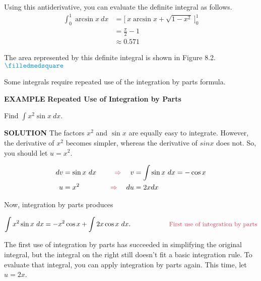 \documentclass[oneside]{book}
\begin{document}
\noindent Using this antiderivative, you can evaluate the definite integral as follows.
\begin{align*}
\int_0^1 \arcsin x \ dx &= \bigg[ \ x \arcsin x + \sqrt{1 - x^2} \ \bigg]_0^1 \\
&= \frac{\pi}{2} - 1 \\
&\approx 0.571
\end{align*}

\noindent The area represented by this definite integral is shown in Figure 8.2. \hspace{4cm} $\color{myblue} \filledmedsquare$

\vspace{1cm}

Some integrals require repeated use of the integration by parts formula. 

\bigskip

\sffamily
\noindent \color{myblue} \large \textbf{EXAMPLE} \color{black} \normalsize \textbf{Repeated Use of Integration by Parts}
\rmfamily

\bigskip

\noindent Find $ \displaystyle \int x^2 \sin x \ dx$.

\bigskip

\sffamily
\noindent \color{myblue} \textbf{SOLUTION} \color{black} \rmfamily \hspace{.3cm} The factors $x^2$ and $\sin x$ are equally easy to integrate. However, the derivative of $x^2$ becomes simpler, whereas the derivative of $sin x$ does not. So, you should let $u = x^2$.

\begin{alignat*}{3}
dv &= \sin x \ dx \quad &\color{mypink}\Rightarrow\color{black} \quad  v &= \int \sin x \ dx = -\cos x \\
u &= x^2 &\color{mypink}\Rightarrow\color{black} \quad  du &= 2x dx
\end{alignat*}

\noindent Now, integration by parts produces

$$ \int x^2 \sin x \ dx = -x^2 \cos x + \int 2x \cos x \ dx. \hspace{2cm} \text{\color{mypink}\small First use of integration by parts} $$

\noindent The first use of integration by parts has succeeded in simplifying the original integral, but the integral on the right still doesn't fit a basic integration rule. To evaluate that integral, you can apply integration by parts again. This time, let $u = 2x$.
\end{document}
